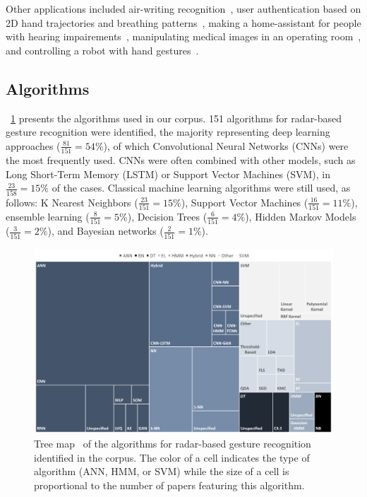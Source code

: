 Other applications included air-writing recognition~\cite{Wang:2020a}, user authentication based on 2D hand trajectories and breathing patterns~\cite{Leem:2020b}, making a home-assistant for people with hearing impairements~\cite{Santhalingam:2020b}, manipulating medical images in an operating room~\cite{Miller:2020}, and controlling a robot with hand gestures~\cite{Zhang:2020a,Li:2009}.

\subsection{Algorithms} \label{sec:state_of_the_art:radar:algorithms}

\fig~\ref{fig:state_of_the_art:radar:algorithms} presents the algorithms used in our corpus.
151 algorithms for radar-based gesture recognition were identified, the majority representing deep learning approaches ($\frac{81}{151}=54\%$), of which Convolutional Neural Networks (CNNs) were the most frequently used.
CNNs were often combined with other models, such as Long Short-Term Memory (LSTM) or Support Vector Machines (SVM), in $\frac{23}{158}=15\%$ of the cases.
Classical machine learning algorithms were still used, as follows: K Nearest Neighbors ($\frac{23}{151}=15\%$), Support Vector Machines ($\frac{16}{151}=11\%$), ensemble learning ($\frac{8}{151}=5\%$), Decision Trees ($\frac{6}{151}=4\%$), Hidden Markov Models ($\frac{3}{151}=2\%$), and Bayesian networks ($\frac{2}{151}=1\%$). 

\begin{figure}[t]
    \centering
    \includegraphics[width=\linewidth]{Figures/StateOfTheArt/Radar/treemap-algorithms.pdf}
    \vspace{-10pt}
    \caption{Tree map~\cite{Shneiderman:1992} of the algorithms for radar-based gesture recognition identified in the corpus. The color of a cell indicates the type of algorithm (\eg ANN, HMM, or SVM) while the size of a cell is proportional to the number of papers featuring this algorithm.}
    \label{fig:state_of_the_art:radar:algorithms}
\end{figure}



